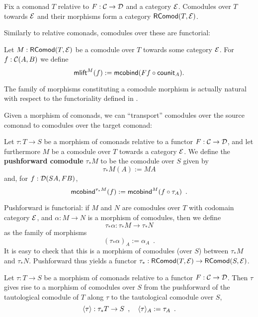 \documentclass{amsart}
\newcommand{\fat}[1]{\textbf{#1}}
\begin{document}
\begin{remark}
 Fix a comonad $T$ relative to $F:\C\to\D$ and a category $\E$.
 Comodules over $T$ towards $\E$ and their morphisms  form a category $\RComod(T,\E)$.
\end{remark}

Similarly to relative comonads, comodules over these are functorial:

\begin{definition}\label{def:comodule_lift}
 Let $M : \RComod(T,\E)$ be a comodule over $T$ towards some category $\E$. For $f : \C(A,B)$ we define
  \[ \mlift^M(f) := \mcobind(\comp{\counit_A}{Ff}) .  \]
\end{definition}


\begin{remark}
  The family of morphisms constituting a comodule morphism is actually natural with respect to the functoriality 
  defined in .
\end{remark}

Given a morphism of comonads, we can \enquote{transport} comodules over the source comonad to comodules over the target comonad:


\begin{definition}\label{def:pushforward_comodule} %
  Let $\tau : T\to S$ be a morphism of comonads relative to a functor $F : \C \to \D$, and let furthermore $M$ be a 
  comodule over $T$ towards a category $\E$. We define the \fat{pushforward comodule} $\tau_*M$ to be the comodule over $S$ given by
  \[  \tau_*M(A) := MA \]
  and, for $f : \D(SA,FB)$,
   \[ \mcobind^{\tau_*M}(f) := \mcobind^M(\comp{\tau_A}{f}) \enspace . \]
   
  \noindent
  Pushforward is functorial: if $M$ and $N$ are comodules over $T$ with codomain category $\E$, and $\alpha : M\to N$ is 
    a morphism of comodules, then we define \[\tau_*\alpha : \tau_*M \to \tau_*N\] 
    as the family of morphisms
     \[ (\tau_*\alpha)_A := \alpha_A \enspace . \]
  It is easy to check that this is a morphism of comodules (over $S$) between $\tau_*M$ and $\tau_*N$.
  Pushforward thus yields a functor $\tau_*:\RComod(T,\E) \to \RComod(S,\E)$.
\end{definition}


\begin{definition}\label{def:induced} %
  Let $\tau : T\to S$ be a morphism of comonads relative to a functor $F : \C \to \D$.
  Then $\tau$ gives rise to a morphism of comodules over $S$ from the pushforward of the tautological comodule
  of $T$ along $\tau$ to the tautological comodule over $S$,
  \[ \induced{\tau} : \tau_*T \to S \enspace , \quad \induced{\tau}_A := \tau_A \enspace . \]
\end{definition}
\end{document}
